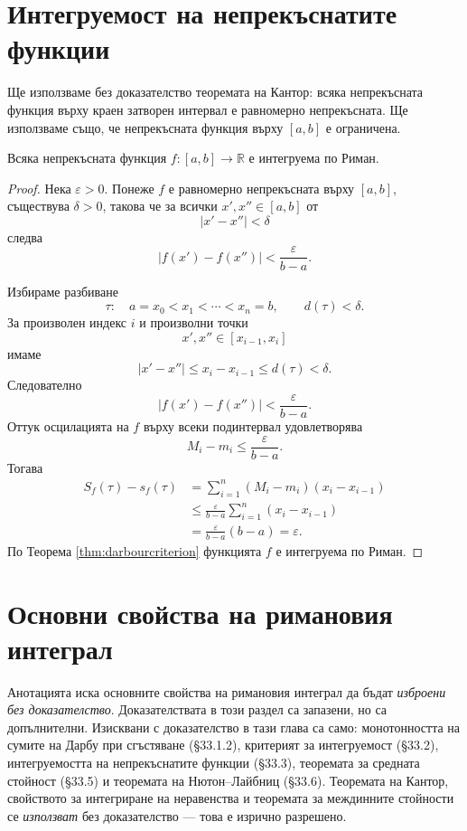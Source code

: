 \section{Интегруемост на непрекъснатите функции}\label{s:33.3}

Ще използваме без доказателство теоремата на Кантор: всяка непрекъсната функция върху краен затворен интервал е равномерно непрекъсната. Ще използваме също, че непрекъсната функция върху $[a,b]$ е ограничена.

\begin{thm}
Всяка непрекъсната функция $f\colon[a,b]\to\mathbb{R}$ е интегруема по Риман.
\end{thm}

\begin{proof}
Нека $\varepsilon>0$. Понеже $f$ е равномерно непрекъсната върху $[a,b]$, съществува $\delta>0$, такова че за всички $x',x''\in[a,b]$ от
\[
|x'-x''|<\delta
\]
следва
\[
|f(x')-f(x'')|<\frac{\varepsilon}{b-a}.
\]

Избираме разбиване
\[
\tau\colon\quad a=x_0<x_1<\cdots<x_n=b,
\qquad
d(\tau)<\delta.
\]
За произволен индекс $i$ и произволни точки
\[
x',x''\in[x_{i-1},x_i]
\]
имаме
\[
|x'-x''|\leq x_i-x_{i-1}\leq d(\tau)<\delta.
\]
Следователно
\[
|f(x')-f(x'')|<\frac{\varepsilon}{b-a}.
\]
Оттук осцилацията на $f$ върху всеки подинтервал удовлетворява
\[
M_i-m_i\leq\frac{\varepsilon}{b-a}.
\]
Тогава
\begin{align*}
S_f(\tau)-s_f(\tau)
&=\sum_{i=1}^{n}(M_i-m_i)(x_i-x_{i-1})\\
&\leq
\frac{\varepsilon}{b-a}
\sum_{i=1}^{n}(x_i-x_{i-1})\\
&=
\frac{\varepsilon}{b-a}(b-a)
=
\varepsilon.
\end{align*}
По Теорема \ref{thm:darbourcriterion} функцията $f$ е интегруема по Риман.
\end{proof}

\section{Основни свойства на римановия интеграл}\label{s:33.4}

\begin{supp}
Анотацията иска основните свойства на римановия интеграл да бъдат
\emph{изброени без доказателство}. Доказателствата в този раздел са запазени, но
са допълнителни. Изисквани с доказателство в тази глава са само: монотонността
на сумите на Дарбу при сгъстяване (\S33.1.2), критерият за интегруемост
(\S33.2), интегруемостта на непрекъснатите функции (\S33.3), теоремата за
средната стойност (\S33.5) и теоремата на Нютон--Лайбниц (\S33.6). Теоремата на
Кантор, свойството за интегриране на неравенства и теоремата за междинните
стойности се \emph{използват} без доказателство --- това е изрично разрешено.
\end{supp}

